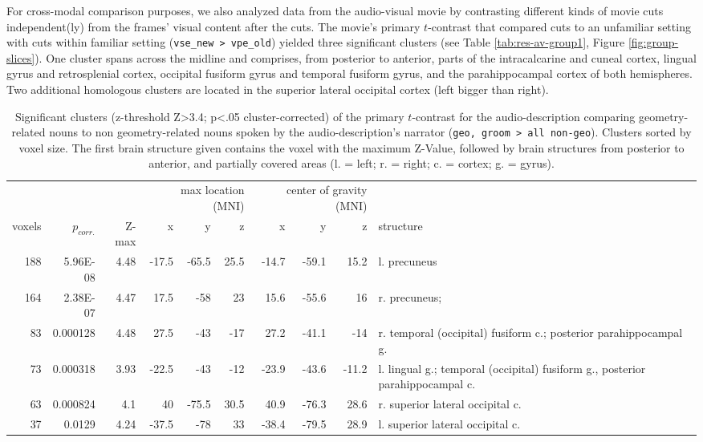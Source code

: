 \documentclass[english]{article}
\begin{document}
For cross-modal comparison purposes, we also analyzed data from the audio-visual
movie by contrasting different kinds of movie cuts independent(ly) from the
frames' visual content after the cuts.
The movie's primary $t$-contrast that compared cuts to an unfamiliar setting
with cuts within familiar setting (\texttt{vse\_new > vpe\_old}) yielded three
significant clusters (see Table \ref{tab:res-av-group1}, Figure
\ref{fig:group-slices}).
One cluster spans across the midline and comprises, from posterior to anterior,
parts of the intracalcarine and cuneal cortex, lingual gyrus and retrosplenial
cortex, occipital fusiform gyrus and temporal fusiform gyrus, and the
parahippocampal cortex of both hemispheres.
Two additional homologous clusters are located in the superior lateral occipital
cortex (left bigger than right).


\begin{table}[t]
    \caption{Significant clusters (z-threshold Z>3.4; p<.05 cluster-corrected)
        of the primary $t$-contrast for the audio-description comparing
        geometry-related nouns to non geometry-related nouns spoken by the
        audio-description's narrator (\texttt{geo, groom > all non-geo}).
        Clusters sorted by voxel size.
    The first brain structure given contains the voxel with the maximum Z-Value,
followed by brain structures from posterior to anterior, and partially covered
areas (l. = left; r. = right; c. = cortex; g. = gyrus).}
    \label{tab:res-ao-group1}
\begin{tabular}{rrrrrrrrrp{3cm}}
\toprule
& & & \multicolumn{3}{r}{max location (MNI)} & \multicolumn{3}{r}{center of gravity (MNI)} &
\\ \cmidrule{4-6} \cmidrule{7-9}
voxels & $p_{corr.}$ & Z-max & x & y & z  & x & y & z & structure \\
\midrule
188 & 5.96E-08 & 4.48 & -17.5 & -65.5 & 25.5 & -14.7 & -59.1 & 15.2 & l. precuneus \\
164 & 2.38E-07 & 4.47 & 17.5 & -58 & 23 & 15.6 & -55.6 & 16 & r. precuneus; \\
83 & 0.000128 & 4.48 & 27.5 & -43 & -17 & 27.2 & -41.1 & -14 & r. temporal (occipital) fusiform c.; posterior parahippocampal g. \\
73 & 0.000318 & 3.93 & -22.5 & -43 & -12 & -23.9 & -43.6 & -11.2 & l. lingual g.; temporal (occipital) fusiform g., posterior parahippocampal c. \\
63 & 0.000824 & 4.1 & 40 & -75.5 & 30.5 & 40.9 & -76.3 & 28.6 & r. superior lateral occipital c. \\
37 & 0.0129 & 4.24 & -37.5 & -78 & 33 & -38.4 & -79.5 & 28.9 & l. superior lateral occipital c. \\
\bottomrule
\end{tabular}
\end{table}
\end{document}
